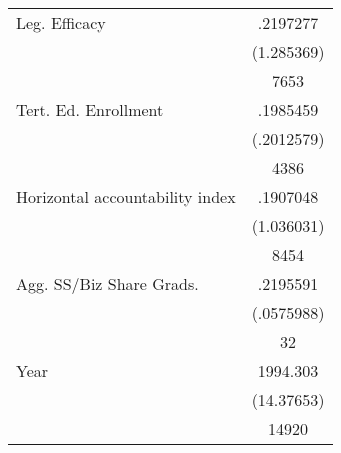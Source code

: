{\begin{longtable}{l*{1}{c}}
Leg. Efficacy       &    .2197277\\
                    &  (1.285369)\\
                    &        7653\\
Tert. Ed. Enrollment&    .1985459\\
                    &  (.2012579)\\
                    &        4386\\
Horizontal accountability index&    .1907048\\
                    &  (1.036031)\\
                    &        8454\\
Agg. SS/Biz Share Grads.&    .2195591\\
                    &  (.0575988)\\
                    &          32\\
Year                &    1994.303\\
                    &  (14.37653)\\
                    &       14920\\
\hline\hline
\end{longtable}
}
